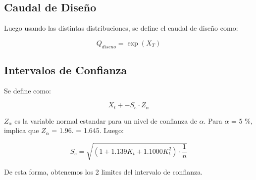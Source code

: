 \subsection{Caudal de Diseño}

Luego usando las distintas distribuciones, se define el caudal de diseño como:

\begin{equation}
    Q_{diseno} = \exp(X_T)
\end{equation}

\subsection{Intervalos de Confianza}

Se define como:

\begin{equation}
    X_t + - S_e \cdot Z_{\alpha}
\end{equation}

\textbf{$Z_{\alpha}$} es la variable normal estandar para un nivel de confianza de $\alpha$. Para $\alpha$ = 5 \%, implica que $Z_{\alpha}$ = 1.96. = 1.645. Luego:

\begin{equation}
    S_e = \sqrt{(1+1.139K_t + 1.1000K_t^2) \cdot \frac{1}{n}}
\end{equation}

De esta forma, obtenemos los 2 limites del intervalo de confianza.